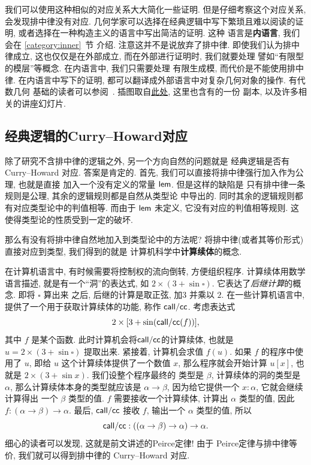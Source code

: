 我们可以使用这种相似的对应关系大大简化一些证明.
但是仔细考察这个对应关系, 会发现排中律没有对应.
几何学家可以选择在经典逻辑中写下繁琐且难以阅读的证明,
或者选择在一种构造主义的语言中写出简洁的证明. 这种
语言是\textbf{内语言}, 我们会在 \ref{category:inner}~节
介绍. 注意这并不是说放弃了排中律. 即使我们认为排中律成立,
这也仅仅是在外部成立, 而在外部进行证明时, 我们就要处理
譬如“有限型的模层”等概念. 在内语言中, 我们只需要处理
有限生成模, 而代价是不能使用排中律. 在内语言中写下的证明,
都可以翻译成外部语言中对复杂几何对象的操作. 有代数几何
基础的读者可以参阅~\cite{blechschmidt:2021:internal}.
插图取自\href{https://github.com/iblech/internal-methods}{此处},
这里也含有\cite{blechschmidt:2021:internal}的一份
副本, 以及许多相关的讲座幻灯片.

\subsection{经典逻辑的Curry--Howard对应}\label{ch:classical}

除了研究不含排中律的逻辑之外, 另一个方向自然的问题就是
经典逻辑是否有 Curry--Howard 对应. 答案是肯定的.
首先, 我们可以直接将排中律强行加入作为公理, 也就是直接
加入一个没有定义的常量 \(\textsf{lem}\). 但是这样的缺陷是
只有排中律一条规则是公理, 其余的逻辑规则都是自然从类型论
中导出的. 同时其余的逻辑规则都有对应类型论中的判值相等.
而由于 \(\textsf{lem}\) 未定义, 它没有对应的判值相等规则.
这使得类型论的性质受到一定的破坏.

那么有没有将排中律自然地加入到类型论中的方法呢?
将排中律(或者其等价形式)直接对应到类型, 我们得到的就是
计算机科学中\textbf{计算续体}的概念.

在计算机语言中,
有时候需要将控制权的流向倒转, 方便组织程序.
计算续体用数学语言描述, 就是有一个“洞”的表达式,
如 \(2 \times (3 + \sin \square)\).
它表达了\emph{后继计算}的概念. 即将 \(\square\) 算出来
之后, 后继的计算是取正弦, 加\(3\) 并乘以 \(2\).
在一些计算机语言中, 提供了一个用于获取计算续体的功能,
称作 \(\textsf{call/cc}\). 考虑表达式
\[2 \times [3 + \sin(\textsf{call/cc}(f))],\]
其中 \(f\) 是某个函数.
此时计算机会将\(\textsf{call/cc}\)的计算续体, 也就是
\(u = 2 \times (3 + \sin \square)\) 提取出来.
紧接着, 计算机会求值 \(f(u)\).
如果 \(f\) 的程序中使用了 \(u\), 即给
\(u\) 这个计算续体提供了一个数值 \(x\),
那么程序就会开始计算 \(u[x]\), 也就是
\(2 \times (3 + \sin x)\). 我们设整个程序最终的
类型是 \(\beta\), 计算续体的洞的类型是 \(\alpha\),
那么计算续体本身的类型就应该是 \(\alpha \to \beta\),
因为给它提供一个 \(x : \alpha\), 它就会继续计算得出
一个 \(\beta\) 类型的值. \(f\) 需要接收一个计算续体,
计算出 \(\alpha\) 类型的值, 因此
\(f : (\alpha \to \beta) \to\alpha\). 最后,
\(\textsf{call/cc}\) 接收 \(f\), 输出一个 \(\alpha\)
类型的值, 所以
\[\textsf{call/cc} : ((\alpha \to \beta)\to\alpha)\to\alpha.\]
细心的读者可以发现, 这就是前文讲述的Peirce定律! 由于
Peirce定律与排中律等价, 我们就可以得到排中律的
Curry--Howard 对应.

